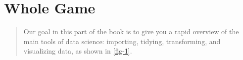 \documentclass[openany]{book}
\begin{document}
\part{Whole Game}
\begin{quote}
    Our goal in this part of the book is to give you a rapid overview of the main tools of data science: importing, tidying, transforming, and visualizing data, as shown in \autoref{fig-1}.

\end{quote}


\end{document}
